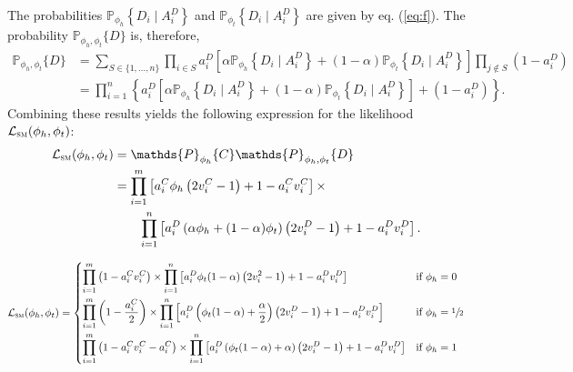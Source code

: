 \documentclass[a4paper,12pt]{article}
\begin{document}
The probabilities $\mathds{P}_{\phi_h} \left\{D_i \mid A_i^D\right\}$ and $\mathds{P}_{\phi_t} \left\{D_i \mid A_i^D\right\}$ are given by eq. (\ref{eq:f}). The probability $\mathds{P}_{\phi_h, \phi_t} \{D\} $ is, therefore,  
\begin{equation}
 \begin{aligned}
  \mathds{P}_{\phi_h, \phi_t} \{D\} & = \sum_{S \in \{1,\dots,n\}} \prod_{i \in S} a_i^D \left[ \alpha \mathds{P}_{\phi_h} \left\{D_i \mid A_i^D\right\} + (1 - \alpha) \mathds{P}_{\phi_t} \left\{D_i \mid A_i^D\right\} \right] \prod_{j \not \in S} \left(1 - a_i^D \right) \\
  & = \prod_{i = 1}^n \left\{ a_i^D \left[ \alpha \mathds{P}_{\phi_h} \left\{D_i \mid A_i^D\right\} + (1 - \alpha) \mathds{P}_{\phi_t} \left\{D_i \mid A_i^D\right\} \right] + \left(1 - a_i^D \right) \right\}. 
 \end{aligned}
\end{equation}
Combining these results yields the following expression for the likelihood $\mathcal{L}_\textsc{sm}(\phi_h, \phi_t)$: 
\begin{equation}
 \begin{aligned}
  \mathcal{L}_\textsc{sm}(\phi_h, \phi_t) & = \mathds{P}_{\phi_h} \{C\} \mathds{P}_{\phi_h, \phi_t} \{D\}  \\ 
   & =  \prod_{i = 1}^m \left[a_i^C \phi_h \left(2 v_i^C - 1 \right) + 1 - a_i^C v_i^C \right] \times \\ 
  & \qquad  \prod_{i = 1}^n \left[ a_i^D \left(\alpha \phi_h + (1 - \alpha) \phi_t \right) \left(2 v_i^D - 1 \right)  + 1 - a_i^D v_i^D \right]. 
 \end{aligned}
\end{equation}


\begin{equation}
 \mathcal{L}_{\textsc{sm}} (\phi_h, \phi_t) = \begin{dcases}
	\prod_{i = 1}^m \left( 1 - a_i^C v_i^C \right) \times \prod_{i = 1}^n \left[ a_i^D \phi_t (1 - \alpha)\left(2v_i^2 - 1\right) + 1 - a_i^D v_i^D \right] & \text{if }\phi_h = 0 \\ 
	\prod_{i = 1}^m \left( 1 - \frac{a_i^C}{2} \right) \times \prod_{i = 1}^n \left[ a_i^D \left(\phi_t (1 - \alpha) + \frac{\alpha}{2} \right) \left(2v_i^D - 1 \right) + 1 - a_i^D v_i^D \right] & \text{if }\phi_h = \sfrac{1}{2} \\ 
	\prod_{i = 1}^m \left( 1 - a_i^C v_i^C - a_i^C \right) \times \prod_{i = 1}^n \left[ a_i^D \left(\phi_t (1 - \alpha) + \alpha \right) \left(2v_i^D - 1 \right) + 1 - a_i^D v_i^D \right] & \text{if }\phi_h = 1 \\ 
  \end{dcases}
\end{equation}
\end{document}
